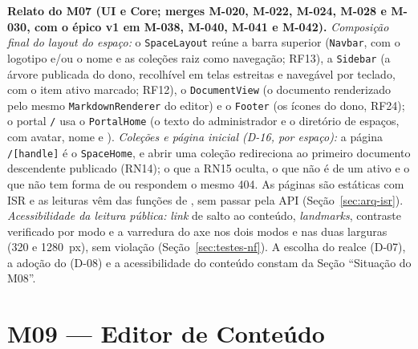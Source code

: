 


\textbf{Relato do M07 (UI e Core; merges M-020, M-022, M-024, M-028 e M-030, com o épico v1 em M-038, M-040, M-041 e M-042).} \emph{Composição final do layout do espaço:} o \texttt{SpaceLayout} reúne a barra superior (\texttt{Navbar}, com o logotipo e/ou o nome e as coleções raiz como navegação; RF13), a \texttt{Sidebar} (a árvore publicada do dono, recolhível em telas estreitas e navegável por teclado, com o item ativo marcado; RF12), o \texttt{DocumentView} (o documento renderizado pelo mesmo \texttt{MarkdownRenderer} do editor) e o \texttt{Footer} (os ícones do dono, RF24); o portal \texttt{/} usa o \texttt{PortalHome} (o texto do administrador e o diretório de espaços, com avatar, nome e ). \emph{Coleções e página inicial (D-16, por espaço):} a página \texttt{/[handle]} é o \texttt{SpaceHome}, e abrir uma coleção redireciona ao primeiro documento descendente publicado (RN14); o que a RN15 oculta, o que não é de um  ativo e o que não tem forma de  ou  respondem o mesmo 404. As páginas são estáticas com ISR e as leituras vêm das funções de , sem passar pela API (Seção~\ref{sec:arq-isr}). \emph{Acessibilidade da leitura pública:} \emph{link} de salto ao conteúdo, \emph{landmarks}, contraste verificado por modo e a varredura do axe nos dois modos e nas duas larguras (320 e 1280~px), sem violação (Seção~\ref{sec:testes-nf}). A escolha do realce (D-07), a adoção do  (D-08) e a acessibilidade do conteúdo constam da Seção ``Situação do M08''.

\section{M09 --- Editor de Conteúdo}\label{sec:impl-editor}

